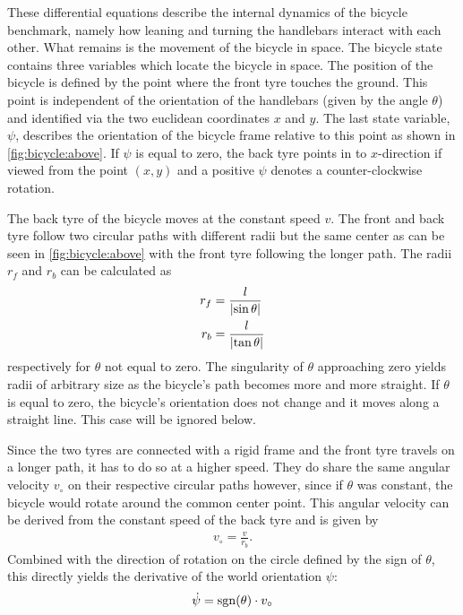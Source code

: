 These differential equations describe the internal dynamics of the bicycle benchmark, namely how leaning and turning the handlebars interact with each other.
What remains is the movement of the bicycle in space.
The bicycle state contains three variables which locate the bicycle in space.
The position of the bicycle is defined by the point where the front tyre touches the ground.
This point is independent of the orientation of the handlebars (given by the angle $\theta$) and identified via the two euclidean coordinates $x$ and $y$.
The last state variable, $\psi$, describes the orientation of the bicycle frame relative to this point as shown in \cref{fig:bicycle:above}.
If $\psi$ is equal to zero, the back tyre points in to $x$-direction if viewed from the point $(x, y)$ and a positive $\psi$ denotes a counter-clockwise rotation.

The back tyre of the bicycle moves at the constant speed $v$.
The front and back tyre follow two circular paths with different radii but the same center as can be seen in \cref{fig:bicycle:above} with the front tyre following the longer path.
The radii $r_f$ and $r_b$ can be calculated as
\begin{align}
    r_f &= \frac{l}{\left\vert \sin \theta \right\vert} \\
    r_b &= \frac{l}{\left\vert \tan \theta \right\vert}
\end{align}
respectively for $\theta$ not equal to zero.
The singularity of $\theta$ approaching zero yields radii of arbitrary size as the bicycle's path becomes more and more straight.
If $\theta$ is equal to zero, the bicycle's orientation does not change and it moves along a straight line.
This case will be ignored below.

Since the two tyres are connected with a rigid frame and the front tyre travels on a longer path, it has to do so at a higher speed.
They do share the same angular velocity $v_\circ$ on their respective circular paths however, since if $\theta$ was constant, the bicycle would rotate around the common center point.
This angular velocity can be derived from the constant speed of the back tyre and is given by
\begin{align}
    v_\circ = \frac{v}{r_b}.
\end{align}
Combined with the direction of rotation on the circle defined by the sign of $\theta$, this directly yields the derivative of the world orientation $\psi$:
\begin{align}
    \dot{\psi} = \operatorname{sgn}(\theta) \cdot v_\circ
\end{align}

